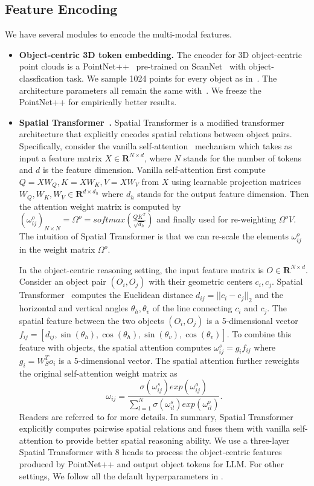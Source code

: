 \subsection{Feature Encoding}\label{sec:supp_embedding}
We have several modules to encode the multi-modal features.
\begin{itemize}[leftmargin=*]
    \item \textbf{Object-centric 3D token embedding.} The encoder for 3D object-centric point clouds is a PointNet++~\citep{qi2017pointnet++} pre-trained on ScanNet~\citep{dai2017scannet} with object-classfication task. We sample 1024 points for every object as in~\cite{chen2022language}. The architecture parameters all remain the same with~\cite{chen2022language}. We freeze the PointNet++ for empirically better results. %

    \item \textbf{Spatial Transformer~\citep{chen2022language}.} Spatial Transformer is a modified transformer architecture that explicitly encodes spatial relations between object pairs. Specifically, consider the vanilla self-attention~\citep{vaswani2017attention} mechanism which takes as input a feature matrix $X\in \mathbf{R}^{N\times d}$, where $N$ stands for the number of tokens and $d$ is the feature dimension. Vanilla self-attention first compute $Q=XW_Q, K=XW_K, V=XW_V$ from $X$ using learnable projection matrices $W_Q, W_K, W_V\in \mathbf{R}^{d\times d_h}$ where $d_h$ stands for the output feature dimension. Then the attention weight matrix is computed by $(\omega^o_{ij})_{N\times N} = \Omega^o = softmax(\frac{QK^T}{\sqrt{d_h}})$ and finally used for re-weighting $\Omega^oV$. The intuition of Spatial Transformer is that we can re-scale the elements $\omega_{ij}^o$ in the weight matrix $\Omega^o$.
    
    In the object-centric reasoning setting, the input feature matrix is $O\in \mathbf{R}^{N\times d}$. Consider an object pair $(O_i, O_j)$ with their geometric centers $c_i, c_j$. Spatial Transformer~\citep{chen2022language} computes the Euclidean distance $d_{ij} = ||c_i-c_j||_2$ and the horizontal and vertical angles $\theta_h, \theta_v$ of the line connecting $c_i$ and $c_j$. The spatial feature between the two objects $(O_i, O_j)$ is a 5-dimensional vector $f_{ij} = [d_{ij}, \sin{(\theta_h)}, \cos{(\theta_h)}, \sin{(\theta_v)}, \cos{(\theta_v)}]$. To combine this feature with objects, the spatial attention computes $\omega^s_{ij} = g_i f_{ij}$ where $g_i=W_S^To_i$ is a 5-dimensional vector. The spatial attention further reweights the original self-attention weight matrix as
    $$
    \omega_{ij}=\frac{\sigma(\omega^s_{ij})exp(\omega^o_{ij})}{\sum_{l=1}^N\sigma(\omega^s_{il})exp(\omega^o_{il})}.
    $$
    Readers are referred to \cite{chen2022language} for more details. In summary, Spatial Transformer explicitly computes pairwise spatial relations and fuses them with vanilla self-attention to provide better spatial reasoning ability. We use a three-layer Spatial Transformer with 8 heads to process the object-centric features produced by PointNet++ and output object tokens for LLM. For other settings, We follow all the default hyperparameters in \cite{chen2022language}.
    

\end{itemize}
